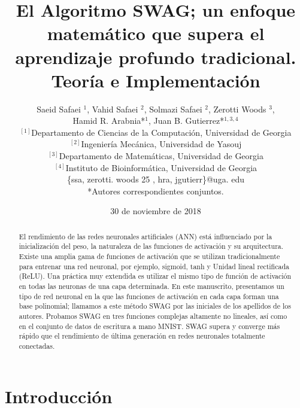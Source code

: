 \documentclass[10pt]{article}
\title{El Algoritmo SWAG; un enfoque matemático que supera el aprendizaje profundo tradicional. Teoría e Implementación}
\author{Saeid Safaei ${ }^{1}$, Vahid Safaei $^{2}$, Solmazi Safaei $^{2}$, Zerotti Woods ${ }^{3}$,\\
Hamid R. Arabnia*$^{1}$, Juan B. Gutierrez*$^{1,3,4}$\\
$^{[1]}$Departamento de Ciencias de la Computación, Universidad de Georgia\\
$^{[2]}$Ingeniería Mecánica, Universidad de Yasouj\\
$^{[3]}$Departamento de Matemáticas, Universidad de Georgia\\
$^{[4]}$Instituto de Bioinformática, Universidad de Georgia\\
\{ssa, zerotti. woods 25 , hra, jgutierr\}@uga. edu\\
*Autores correspondientes conjuntos.}
\date{30 de noviembre de 2018}
\begin{document}
\maketitle
\begin{abstract}
El rendimiento de las redes neuronales artificiales (ANN) está influenciado por la inicialización del peso, la naturaleza de las funciones de activación y su arquitectura. Existe una amplia gama de funciones de activación que se utilizan tradicionalmente para entrenar una red neuronal, por ejemplo, sigmoid, tanh y Unidad lineal rectificada (ReLU). Una práctica muy extendida es utilizar el mismo tipo de función de activación en todas las neuronas de una capa determinada. En este manuscrito, presentamos un tipo de red neuronal en la que las funciones de activación en cada capa forman una base polinomial;
llamamos a este método SWAG por las iniciales de los apellidos de los autores. Probamos SWAG en tres funciones complejas altamente no lineales, así como en el conjunto de datos de escritura a mano MNIST. SWAG supera y converge más rápido que el rendimiento de última generación en redes neuronales totalmente conectadas.
\end{abstract}
\section{Introducción}
\end{document}
